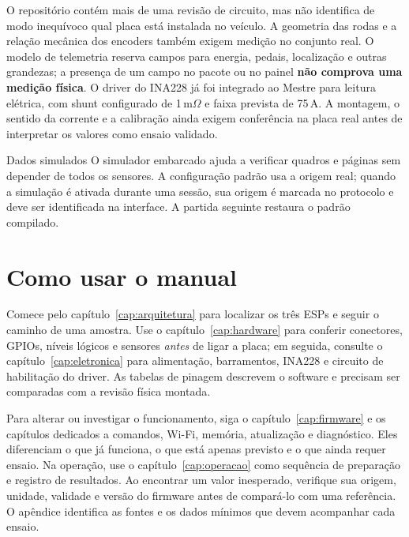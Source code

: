O repositório contém mais de uma revisão de circuito, mas não identifica de modo inequívoco qual placa está instalada no veículo. A geometria das rodas e a relação mecânica dos encoders também exigem medição no conjunto real. O modelo de telemetria reserva campos para energia, pedais, localização e outras grandezas; a presença de um campo no pacote ou no painel \textbf{não comprova uma medição física}. O driver do INA228 já foi integrado ao Mestre para leitura elétrica, com shunt configurado de 1\,m$\Omega$ e faixa prevista de 75\,A. A montagem, o sentido da corrente e a calibração ainda exigem conferência na placa real antes de interpretar os valores como ensaio validado.

\begin{nota}{Dados simulados}
O simulador embarcado ajuda a verificar quadros e páginas sem depender de todos os sensores. A configuração padrão usa a origem real; quando a simulação é ativada durante uma sessão, sua origem é marcada no protocolo e deve ser identificada na interface. A partida seguinte restaura o padrão compilado.
\end{nota}

\section{Como usar o manual}
Comece pelo capítulo~\ref{cap:arquitetura} para localizar os três ESPs e seguir o caminho de uma amostra. Use o capítulo~\ref{cap:hardware} para conferir conectores, GPIOs, níveis lógicos e sensores \emph{antes} de ligar a placa; em seguida, consulte o capítulo~\ref{cap:eletronica} para alimentação, barramentos, INA228 e circuito de habilitação do driver. As tabelas de pinagem descrevem o software e precisam ser comparadas com a revisão física montada.

Para alterar ou investigar o funcionamento, siga o capítulo~\ref{cap:firmware} e os capítulos dedicados a comandos, Wi-Fi, memória, atualização e diagnóstico. Eles diferenciam o que já funciona, o que está apenas previsto e o que ainda requer ensaio. Na operação, use o capítulo~\ref{cap:operacao} como sequência de preparação e registro de resultados. Ao encontrar um valor inesperado, verifique sua origem, unidade, validade e versão do firmware antes de compará-lo com uma referência. O apêndice identifica as fontes e os dados mínimos que devem acompanhar cada ensaio.
